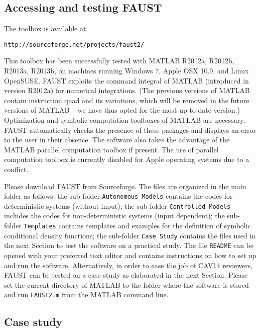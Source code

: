 \documentclass{llncs}
\newcommand{\software}{\textsf{FAUST}\xspace}
\begin{document}
\subsection*{Accessing and testing \software}
The toolbox is available at
\vspace{-0.2cm}
\begin{center}
{\small\texttt{http://sourceforge.net/projects/faust2/}}
\end{center}
This toolbox has been successfully tested with MATLAB R2012a, R2012b, R2013a, R2013b, 
on machines running Windows 7, Apple OSX 10.9, and Linux OpenSUSE.  
\software exploits the command \textsf{integral} of MATLAB (introduced in version R2012a) for numerical integrations. 
(The previous versions of MATLAB contain instruction \textsf{quad} and its variations, 
which will be removed in the future versions of MATLAB -- 
we have thus opted for the most up-to-date version.)
Optimization and symbolic computation toolboxes of MATLAB are necessary.
\software automatically checks the presence of these packages and displays an error to the user in their absence.
The software also takes the advantage of the MATLAB parallel computation toolbox if present.     
The use of parallel computation toolbox is currently disabled for Apple operating systems due to a conflict. 

Please download \software from Sourceforge. 
The files are organized in the main folder as follows:
the sub-folder \texttt{Autonomous Models} contains the codes for deterministic systems (without input);
the sub-folder \texttt{Controlled Models} includes the codes for non-deterministic systems (input dependent);
the sub-folder \texttt{Templates} contains templates and examples for the definition of symbolic conditional density functions; 
the sub-folder \texttt{Case Study} contains the files used in the next Section to test the software on a practical study.
The file \texttt{README} can be opened with your preferred text editor and contains instructions on how to set up and run the software.
Alternatively, in order to ease the job of CAV14 reviewers, 
\software can be tested on a case study as elaborated in the next Section.  
Please set the current directory of MATLAB to the folder where the software is stored and run \texttt{FAUST2.m} from the MATLAB command line. 

\subsection*{Case study}
\label{CB}
\end{document}

